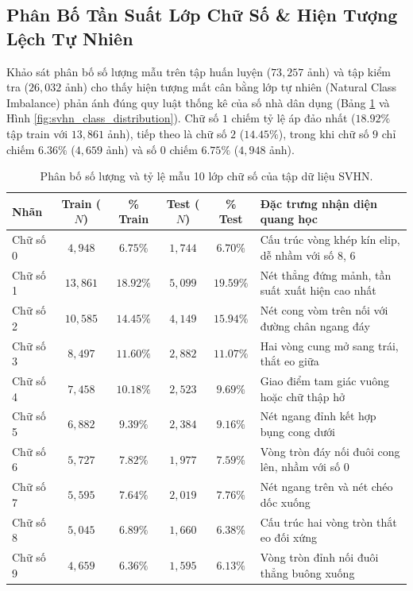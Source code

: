 \documentclass[12pt,a4paper]{report}
\begin{document}
\subsection{Phân Bố Tần Suất Lớp Chữ Số \& Hiện Tượng Lệch Tự Nhiên}
Khảo sát phân bố số lượng mẫu trên tập huấn luyện ($73,257$ ảnh) và tập kiểm tra ($26,032$ ảnh) cho thấy hiện tượng mất cân bằng lớp tự nhiên (Natural Class Imbalance) phản ánh đúng quy luật thống kê của số nhà dân dụng (Bảng \ref{tab:svhn_stats} và Hình \ref{fig:svhn_class_distribution}). Chữ số $1$ chiếm tỷ lệ áp đảo nhất ($18.92\%$ tập train với $13,861$ ảnh), tiếp theo là chữ số $2$ ($14.45\%$), trong khi chữ số $9$ chỉ chiếm $6.36\%$ ($4,659$ ảnh) và số $0$ chiếm $6.75\%$ ($4,948$ ảnh).

\begin{table}[H]
\centering
\caption{Phân bố số lượng và tỷ lệ mẫu 10 lớp chữ số của tập dữ liệu SVHN.}
\label{tab:svhn_stats}
\small
\setlength{\tabcolsep}{5pt}
\begin{tabularx}{\textwidth}{lccccX}
\toprule
\textbf{Nhãn} & \textbf{Train ($N$)} & \textbf{\% Train} & \textbf{Test ($N$)} & \textbf{\% Test} & \textbf{Đặc trưng nhận diện quang học} \\
\midrule
Chữ số 0 & $4,948$  & $6.75\%$  & $1,744$ & $6.70\%$  & Cấu trúc vòng khép kín elip, dễ nhầm với số 8, 6 \\
Chữ số 1 & $13,861$ & $18.92\%$ & $5,099$ & $19.59\%$ & Nét thẳng đứng mảnh, tần suất xuất hiện cao nhất \\
Chữ số 2 & $10,585$ & $14.45\%$ & $4,149$ & $15.94\%$ & Nét cong vòm trên nối với đường chân ngang đáy \\
Chữ số 3 & $8,497$  & $11.60\%$ & $2,882$ & $11.07\%$ & Hai vòng cung mở sang trái, thắt eo giữa \\
Chữ số 4 & $7,458$  & $10.18\%$ & $2,523$ & $9.69\%$  & Giao điểm tam giác vuông hoặc chữ thập hở \\
Chữ số 5 & $6,882$  & $9.39\%$  & $2,384$ & $9.16\%$  & Nét ngang đỉnh kết hợp bụng cong dưới \\
Chữ số 6 & $5,727$  & $7.82\%$  & $1,977$ & $7.59\%$  & Vòng tròn đáy nối đuôi cong lên, nhầm với số 0 \\
Chữ số 7 & $5,595$  & $7.64\%$  & $2,019$ & $7.76\%$  & Nét ngang trên và nét chéo dốc xuống \\
Chữ số 8 & $5,045$  & $6.89\%$  & $1,660$ & $6.38\%$  & Cấu trúc hai vòng tròn thắt eo đối xứng \\
Chữ số 9 & $4,659$  & $6.36\%$  & $1,595$ & $6.13\%$  & Vòng tròn đỉnh nối đuôi thẳng buông xuống \\
\bottomrule
\end{tabularx}
\end{table}
\end{document}
